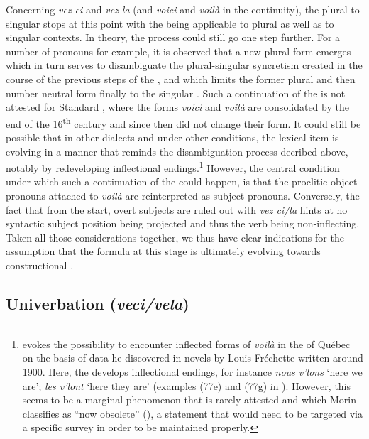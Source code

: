 \documentclass[output=paper,colorlinks,citecolor=brown]{langscibook}
\begin{document}
\largerpage[2]
Concerning \emph{vez ci} and \emph{vez la} (and \emph{voici} and \emph{voilà} in the continuity), the plural-to-singular   stops at this point with the  being applicable to plural as well as to singular contexts. In theory, the process could still go one step further. For a number of pronouns for example, it is observed that a new plural form emerges which in turn serves to disambiguate the plural-singular syncretism created in the course of the previous steps of the , and which limits the former plural and then number neutral form finally to the singular \citep[11--12]{batesmckenzie2021}. Such a continuation of the  is not attested for Standard , where the forms \emph{voici} and \emph{voilà} are consolidated by the end of the 16\textsuperscript{th} century and since then did not change their form. It could still be possible that in other dialects and under other conditions, the lexical item is evolving in a manner that reminds the disambiguation process decribed above, notably by redeveloping inflectional endings.\footnote{\citet[810]{morin1985} evokes the possibility to encounter inflected forms of \emph{voilà} in the  of Québec on the basis of data he discovered in novels by Louis Fréchette written around 1900. Here, the   develops inflectional endings, for instance \emph{nous v'lons} `here we are'; \emph{les v'lont} `here they are' (examples (77e) and (77g) in \citealt[811]{morin1985}). However, this seems to be a marginal phenomenon that is rarely attested and which Morin classifies as ``now obsolete'' (\citealt[810]{morin1985}), a statement that would need to be targeted via a specific survey in order to be maintained properly.} However, the central condition under which such a continuation of the  could happen, is that the proclitic object pronouns attached to \emph{voilà} are reinterpreted as subject pronouns. Conversely, the fact that from the start, overt subjects are ruled out with \emph{vez ci/la} hints at no syntactic subject position being projected and thus the verb being non-inflecting. Taken all those considerations together, we thus have clear indications for the assumption that the  formula at this stage is ultimately evolving towards constructional .

\subsection{Univerbation (\emph{veci/vela})} \label{07sec4.3}
\end{document}
